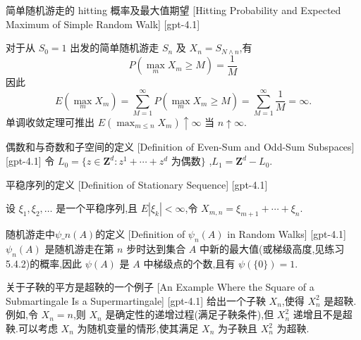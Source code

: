 \documentclass[UTF8]{ctexart}
\begin{document}
    
    
    \begin{thm}
        {简单随机游走的 hitting 概率及最大值期望}
        [Hitting Probability and Expected Maximum of Simple Random Walk]
        [gpt-4.1]
        
对于从 $S_0 = 1$ 出发的简单随机游走 $S_n$ 及 $X_n = S_{N \wedge n}$,有
\[
P \left( \max_m X_m \geq M \right) = \frac{1}{M}
\]
因此
\[
E \left( \max_m X_m \right) = \sum_{M=1}^{\infty} P \left( \max_m X_m \geq M \right) = \sum_{M=1}^{\infty} \frac{1}{M} = \infty.
\]
单调收敛定理可推出 $E \left( \max_{m \leq n} X_m \right) \uparrow \infty$ 当 $n \uparrow \infty$.

    \end{thm}
    
    
    
    \begin{dfn}
        {偶数和与奇数和子空间的定义}
        [Definition of Even-Sum and Odd-Sum Subspaces]
        [gpt-4.1]
        令 $L_{0} = \{ z \in \mathbf{Z}^{d} : z^{1} + \cdots + z^{d} \text{ 为偶数} \}$ ,$L_{1} = \mathbf{Z}^{d} - L_{0}$.
    \end{dfn}
    
    
    
    \begin{dfn}
        {平稳序列的定义}
        [Definition of Stationary Sequence]
        [gpt-4.1]
        
设 $\xi_{1}, \xi_{2}, \ldots$ 是一个平稳序列,且 $E | \xi_{k} | < \infty$,令 $X_{m, n} = \xi_{m+1} + \cdots + \xi_{n}$.

    \end{dfn}
    
    
    
    \begin{dfn}
        {随机游走中$\psi\_n(A)$的定义}
        [Definition of $\psi_n(A)$ in Random Walks]
        [gpt-4.1]
        $\psi_{n}(A)$ 是随机游走在第 $n$ 步时达到集合 $A$ 中新的最大值(或梯级高度,见练习 5.4.2)的概率,因此 $\psi(A)$ 是 $A$ 中梯级点的个数,且有 $\psi(\{0\}) = 1$.
    \end{dfn}
    
    
    
    \begin{xmp}
        {关于子鞅的平方是超鞅的一个例子}
        [An Example Where the Square of a Submartingale Is a Supermartingale]
        [gpt-4.1]
        给出一个子鞅 $X_n$,使得 $X_n^2$ 是超鞅.例如,令 $X_n = n$,则 $X_n$ 是确定性的递增过程(满足子鞅条件),但 $X_n^2$ 递增且不是超鞅.可以考虑 $X_n$ 为随机变量的情形,使其满足 $X_n$ 为子鞅且 $X_n^2$ 为超鞅.
    \end{xmp}
    
\end{document}
